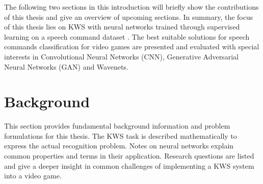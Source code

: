 The following two sections in this introduction will briefly show the contributions of this thesis and give an overview of upcoming sections.
In summary, the focus of this thesis lies on KWS with neural networks trained through supervised learning on a speech command dataset \cite{Warden2018}.
The best suitable solutions for speech commands classification for video games are presented and evaluated with special interests in Convolutional Neural Networks (CNN), Generative Adversarial Neural Networks (GAN) and Wavenets.







\chapter{Background}\label{sec:back}
This section provides fundamental background information and problem formulations for this thesis.
The KWS task is described mathematically to express the actual recognition problem.
Notes on neural networks explain common properties and terms in their application.
Research questions are listed and give a deeper insight in common challenges of implementing a KWS system into a video game.






